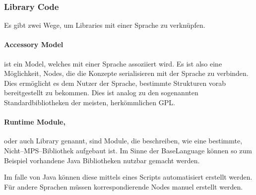 \subsubsection{Library Code}
Es gibt zwei Wege, um Libraries mit einer Sprache zu verknüpfen.

\paragraph{Accessory Model} ist ein Model, welches mit einer Sprache assoziiert wird.
Es ist also eine Möglichkeit, Nodes, die die Konzepte serialisieren mit der Sprache zu verbinden.
Dies ermöglicht es dem Nutzer der Sprache, bestimmte Strukturen vorab bereitgestellt zu bekommen.
Dies ist analog zu den sogenannten Standardbibliotheken der meisten, herkömmlichen \ac{GPL}.

\paragraph{Runtime Module,} oder auch Library genannt, sind Module, die beschreiben, wie eine bestimmte, Nicht--\acs{MPS}--Bibliothek aufgebaut ist.
Im Sinne der BaseLanguage können so zum Beispiel vorhandene Java Bibliotheken nutzbar gemacht werden.

Im falle von Java können diese mittels eines Scripts automatisiert erstellt werden.
Für andere Sprachen müssen korrespondierende Nodes manuel erstellt werden.
